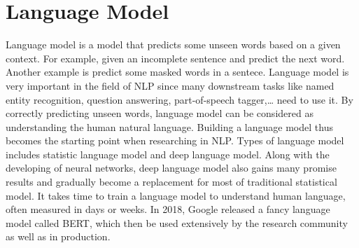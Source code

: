 \documentclass[3p, sort&compress, 12pt]{elsarticle}
\begin{document}
\section{Language Model}
\label{sec:02}
Language model is a model that predicts some unseen words based on a given context. For example, given an incomplete sentence and predict the next word. Another example is predict  some masked words in a sentece. Language model is very important in the field of NLP since many downstream tasks like named entity recognition, question answering, part-of-speech tagger,… need to use it. By correctly predicting unseen words, language model can be considered as understanding the human natural language. Building a language model thus becomes the starting point  when researching in NLP. Types of language model includes statistic language model and deep language model.  Along with the developing of neural networks, deep language model also gains many promise results and gradually become a replacement for most of traditional statistical model. It takes time to train a language model to understand human language, often measured in days or weeks. In 2018, Google released a fancy language model called BERT, which then be used extensively by the research community as well as in production.
\end{document}
